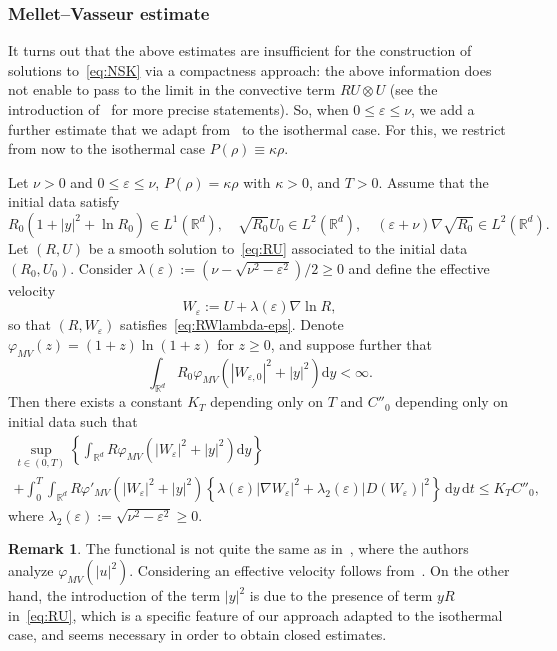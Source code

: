 \documentclass[10pt]{amsart}
\theoremstyle{definition}\newtheorem{defi}[theo]{Definition}\newtheorem{rema}[theo]{Remark}\newtheorem{exam}[theo]{Example}\newtheorem{exem}[theo]{Example}\newtheorem{nota}[theo]{Notation}
\newcommand*\R{\mathbb{R}}
\newcommand*\dd {\mathrm{d}}
\newcommand*\<{\left\langle}
\renewcommand*\>{\right\rangle}
\renewcommand*\le{\leqslant}
\renewcommand*\ge{\geqslant}
\newcommand*\eps{\varepsilon}
\begin{document}
\subsubsection{Mellet--Vasseur estimate}\label{sec:mellet-vasseur}

It turns out that the above estimates are insufficient for the construction of solutions to~\eqref{eq:NSK} via a compactness approach: the above information does not enable to pass to the limit in the convective term $R U \otimes U$ (see the introduction of~\cite{VasseurYuInventiones} for more precise statements). So, when $0 \le \varepsilon \le \nu$, we add a further estimate that we adapt from~\cite{MelletVasseur,AS-comp} to the isothermal case. For this, we restrict from now to the isothermal case $P(\rho)\equiv \kappa \rho.$

\begin{prop}\label{prop:inegaliteMV}
Let $\nu >0$ and $0 \le \varepsilon \le \nu$, $P(\rho) = \kappa \rho$ with $\kappa >0$, and $T>0$. Assume that the initial data satisfy
\[
R_0(1+|y|^2 + \ln R_0) \in L^1 (\R^d), \quad
\sqrt{R_0} U_0 \in L^2(\R^d), \quad (\eps+\nu) \nabla \sqrt{R_0} \in L^2(\R^d).
\]
Let $(R,U)$ be a smooth solution to~\eqref{eq:RU} associated to the initial data $(R_0,U_0)$. Consider $\lambda(\eps) := (\nu - \sqrt{\nu^2 -
\eps^2})/2 \ge 0$ and define the effective velocity
\[
W_\eps := U + \lambda(\eps) \nabla \ln R,
\]
so that $(R,W_\eps)$ satisfies~\eqref{eq:RWlambda-eps}. Denote $\varphi_{MV}(z) = (1+z)\ln(1+z)$ for $z \ge 0$, and suppose further that
\[
\int_{\R^d} R_0 \varphi_{MV}\left(|W_{\eps,0}|^2 + |y|^2\right) \dd y < \infty.
\]
Then there exists a constant $K_T$ depending only on $T$ and $C''_0$ depending only on initial data such that
\begin{multline*}
\sup_{t \in (0,T)} \left\{ \int_{\R^d} R \varphi_{MV}\left(|W_\eps|^2 + |y|^2\right) \dd y\right\} \\
+ \int_{0}^T \int_{\R^d} R \varphi'_{MV}\left(|W_\eps|^2+ |y|^2\right) \left\{ \lambda(\eps) |\nabla W_\eps|^2 + \lambda_2(\eps)|D(W_\eps)|^2 \right\} \, \dd y \, \dd t
\le K_T C''_0,
\end{multline*}
where $\lambda_2(\eps) := \sqrt{\nu^2 - \eps^2} \ge 0$.
\end{prop}

\begin{rema}
The functional is not quite the same as in~\cite{MelletVasseur}, where the authors analyze $\varphi_{MV}(|u|^2)$. Considering an effective velocity follows from~\cite{AS-comp}. On the other hand, the introduction of the term $|y|^2$ is due to the presence of term $yR$ in~\eqref{eq:RU}, which is a specific feature of our approach adapted to the isothermal case, and seems necessary in order to obtain closed estimates.
\end{rema}
\end{document}
